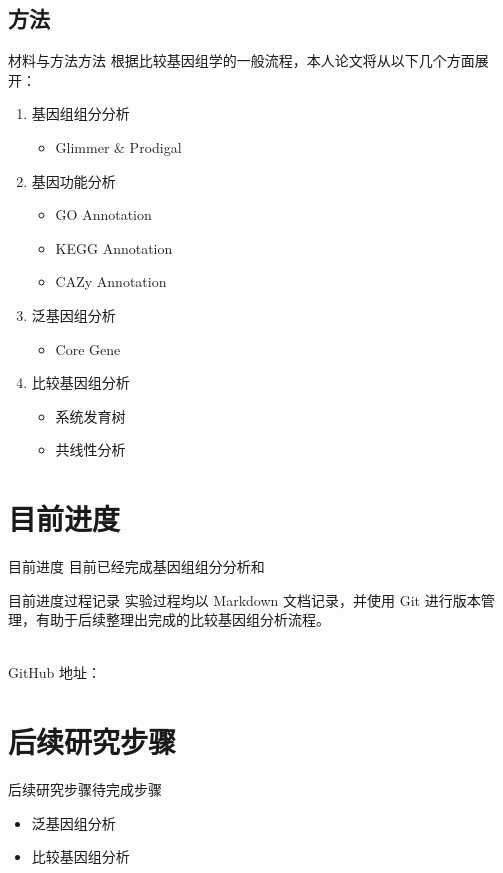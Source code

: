 \documentclass{beamer}
\begin{document}
	\subsection{方法}
	\begin{frame}{材料与方法}{方法}
		根据比较基因组学的一般流程，本人论文将从以下几个方面展开：
		\begin{enumerate}
			\item 基因组组分分析
				\begin{itemize}
					\item Glimmer \& Prodigal
				\end{itemize}
			\item 基因功能分析
				\begin{itemize}
					\item GO Annotation
					\item KEGG Annotation
					\item CAZy Annotation
				\end{itemize}
			\item 泛基因组分析
				\begin{itemize}
					\item Core Gene
				\end{itemize}
			\item 比较基因组分析
				\begin{itemize}
					\item 系统发育树
					\item 共线性分析
				\end{itemize}
		\end{enumerate}
	\end{frame}

	\section{目前进度}
	\begin{frame}{目前进度}{}
		\qquad 目前已经完成基因组组分分析和
	\end{frame}

	\begin{frame}{目前进度}{过程记录}
		\qquad 实验过程均以 Markdown 文档记录，并使用 Git 进行版本管理，有助于后续整理出完成的比较基因组分析流程。

		\quad \\

		GitHub 地址：
	\end{frame}

	\section{后续研究步骤}
	\begin{frame}{后续研究步骤}{待完成步骤}
		\begin{itemize}
			\item 泛基因组分析
			\item 比较基因组分析
		\end{itemize}
		
	\end{frame}
\end{document}
